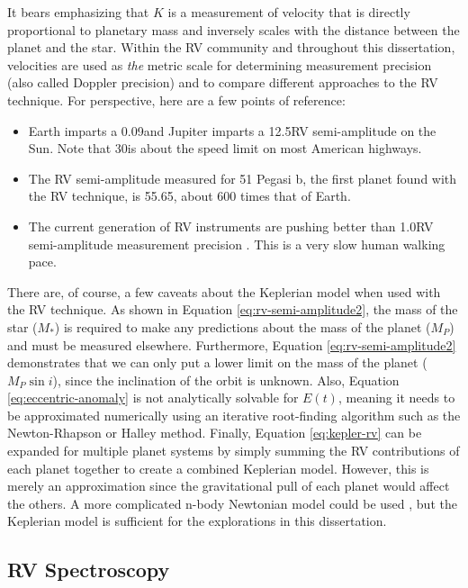 It bears emphasizing that $K$ is a measurement of velocity that is directly proportional to planetary mass and inversely scales with the distance between the planet and the star. Within the RV community and throughout this dissertation, velocities are used as \textit{the} metric scale for determining measurement precision (also called Doppler precision) and to compare different approaches to the RV technique. For perspective, here are a few points of reference:
\begin{itemize}
    \item Earth imparts a 0.09\ms and Jupiter imparts a 12.5\ms RV semi-amplitude on the Sun. Note that 30\ms is about the speed limit on most American highways.
    \item The RV semi-amplitude measured for 51 Pegasi b, the first planet found with the RV technique, is 55.65\ms, about 600 times that of Earth.
    \item The current generation of RV instruments are pushing better than 1.0\ms RV semi-amplitude measurement precision \citep{fischer_state_2016}. This is a very slow human walking pace.
\end{itemize}

There are, of course, a few caveats about the Keplerian model when used with the RV technique. As shown in Equation \ref{eq:rv-semi-amplitude2}, the mass of the star ($M_*$) is required to make any predictions about the mass of the planet ($M_P$) and must be measured elsewhere. Furthermore, Equation \ref{eq:rv-semi-amplitude2} demonstrates that we can only put a lower limit on the mass of the planet ($M_P\sin{i}$), since the inclination of the orbit is unknown. Also, Equation \ref{eq:eccentric-anomaly} is not analytically solvable for $E(t)$, meaning it needs to be approximated numerically using an iterative root-finding algorithm such as the Newton-Rhapson or Halley method. Finally, Equation \ref{eq:kepler-rv} can be expanded for multiple planet systems by simply summing the RV contributions of each planet together to create a combined Keplerian model. However, this is merely an approximation since the gravitational pull of each planet would affect the others. A more complicated n-body Newtonian model could be used \citep[e.g.][]{rivera_75_2005, fischer_five_2008}, but the Keplerian model is sufficient for the explorations in this dissertation.

\subsection{RV Spectroscopy}


